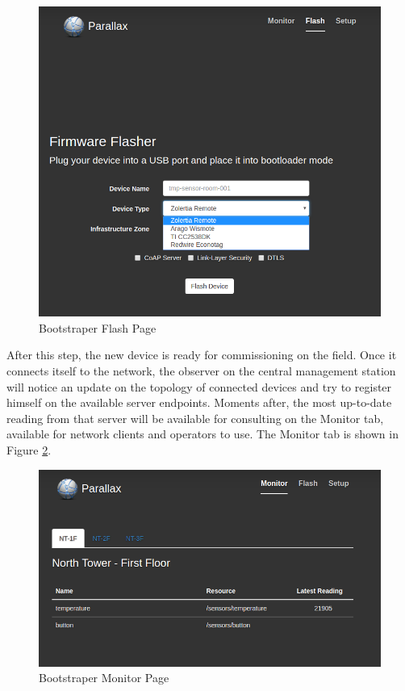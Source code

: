\begin{figure}[h]
  \centering
  \includegraphics[width=0.7\linewidth]{figures/parallax_flash.png}
  \caption{Bootstraper Flash Page}
  \label{fig:bootstraper-flash-page}
\end{figure}

After this step, the new device is ready for commissioning on the field. Once it connects itself to the network, the observer on the central management station will notice an update on the topology of connected devices and try to register himself on the available server endpoints. Moments after, the most up-to-date reading from that server will be available for consulting on the Monitor tab, available for network clients and operators to use. The Monitor tab is shown in Figure \ref{fig:bootstraper-monitor-page}.

\begin{figure}[h]
  \centering
  \includegraphics[width=0.8\linewidth]{figures/parallax_monitor.png}
  \caption{Bootstraper Monitor Page}
  \label{fig:bootstraper-monitor-page}
\end{figure}